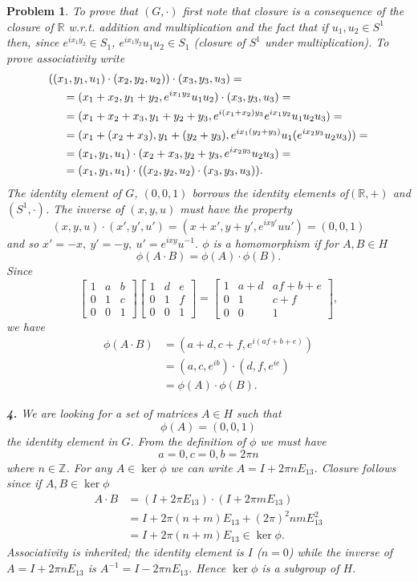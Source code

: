 \documentclass{article}
\theoremstyle{pprop}
\newtheorem{problem}{Problem}[section]
\begin{document}
\begin{problem}
To prove that $(G,\cdot)$ first note that closure is a consequence of the closure of $\mathbb{R}$ w.r.t. addition and multiplication 
and the fact that if $u_1,u_2 \in S^1$ then, since $e^{ix_1y_2} \in S_1$, $e^{ix_1y_2}u_1 u_2 \in S_1$ (closure of $S^1$ under 
multiplication). To prove associativity write
\begin{align*}
& ((x_1,y_1,u_1)\cdot(x_2,y_2,u_2))\cdot(x_3,y_3,u_3)=\\
& \kern3ex=   (x_1+x_2,y_1+y_2,e^{ix_1y_2}u_1u_2)\cdot(x_3,y_3,u_3)=\\
& \kern3ex= (x_1+x_2+x_3,y_1+y_2+y_3,e^{i(x_1+x_2)y_3}e^{ix_1y_2}u_1u_2u_3)=\\
& \kern3ex=
(x_1+(x_2+x_3),y_1+(y_2+y_3),e^{ix_1(y_2+y_3)}u_1(e^{ix_2y_3}u_2u_3))=\\
& \kern3ex=
(x_1,y_1,u_1)\cdot(x_2+x_3,y_2+y_3,e^{ix_2y_3}u_2u_3)=\\
& \kern3ex=
(x_1,y_1,u_1)\cdot((x_2,y_2,u_2)\cdot(x_3,y_3,u_3)).
\end{align*}
The identity element of $G$, $(0,0,1)$ borrows the identity elements of$(\mathbb{R},+)$ and $(S^1,\cdot)$. 
The inverse of $(x,y,u)$ must have the property 
$$
(x,y,u)\cdot(x',y',u')=(x+x',y+y',e^{ixy'}uu')=(0,0,1)
$$
and so $x'=-x,\ y'=-y, \ u'=e^{ixy}u^{-1}$. $\phi$ is a homomorphism if for $A,B \in H$
$$
\phi(A \cdot B) = \phi(A) \cdot \phi(B).
$$
Since
$$
\begin{bmatrix}
1 & a & b \\
0 & 1 & c \\
0 & 0 & 1
\end{bmatrix}
\begin{bmatrix}
1 & d & e \\
0 & 1 & f \\
0 & 0 & 1
\end{bmatrix}=
\begin{bmatrix}
1& a+ d & af +b + e \\
0 & 1 & c+ f \\
0 & 0 & 1
\end{bmatrix},
$$
we have
\begin{align*}
\phi(A \cdot B) & =(a+d, c+f,e^{i(af+b+e)}) \\
& =(a,c,e^{ib}) \cdot (d,f,e^{ie}) \\
& = \phi(A) \cdot \phi(B).
\end{align*}
\par\noindent\textbf{4.} We are looking for a set of matrices $A \in  H$ such that 
$$
\phi(A)=(0,0,1)
$$
the identity element in $G$. From the definition of $\phi$ we must have
$$
a=0, c=0, b =2\pi n
$$
where $n \in \mathbb{Z}$. For any $A \in \ker\phi$ we can write $A=I + 2\pi n E_{13}$. Closure follows since if $A,B\in\ker\phi$ 
\begin{align*}
A \cdot B & = (I + 2 \pi E_{13})\cdot(I + 2\pi m E_{13})\\
& = I +2 \pi (n+m) E_{13} + (2\pi)^2nm E_{13}^2\\  
& =I +2 \pi (n+m) E_{13}  \in \ker\phi.
\end{align*}
Associativity is inherited; the identity element is $I$ ($n=0$) while the inverse of $A=I + 2\pi n E_{13}$ is 
$A^{-1}=I - 2\pi n E_{13}$. Hence $\ker\phi$ is a subgroup of $ H$.
\end{problem}
\end{document}
